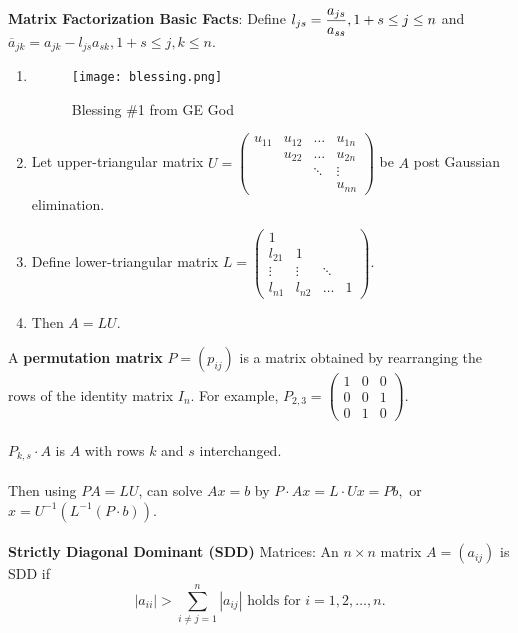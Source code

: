 \documentclass{article}
\begin{document}
\textbf{Matrix Factorization Basic Facts}: Define $l_{js} = \mathlarger{\frac{a_{js}}{a_{ss}}}, 1 + s \leq j \leq n$ and $\overline{a}_{jk} = a_{jk} - l_{js} a_{sk}, 1 + s \leq j, k \leq n.$ \begin{enumerate}
    \item \begin{figure*}[htp]
    \centering
    \texttt{[image: blessing.png]}
    \caption{Blessing \#1 from GE God}
\end{figure*}
    \item Let upper-triangular matrix $U = \begin{pmatrix}
        u_{11} & u_{12} & \dots &u_{1n} \\
        & u_{22} & \dots &u_{2n} \\
        & & \ddots & \vdots \\
        & & & u_{nn}
    \end{pmatrix}$ be $A$ post Gaussian elimination.
    \item Define lower-triangular matrix $L = \begin{pmatrix}
        1 \\
        l_{21} & 1 \\
        \vdots & \vdots & \ddots \\
        l_{n1} & l_{n2} & \dots & 1
    \end{pmatrix}.$
    \item Then $A = LU$.
\end{enumerate} $ $ \\
A \textbf{permutation matrix} $P = (p_{ij})$ is a matrix obtained by rearranging the rows of the identity matrix $I_n$. For example, $P_{2, 3} = \begin{pmatrix}
    1 & 0 & 0 \\
    0 & 0 & 1 \\
    0 & 1 & 0
\end{pmatrix}$. \\ \\
$P_{k, s} \cdot A$ is $A$ with rows $k$ and $s$ interchanged. \\ \\
Then using $PA = LU$, can solve $Ax = b$ by $P \cdot Ax = L \cdot Ux = Pb,$ or $x = U^{-1}(L^{-1} (P \cdot b))$. \\ \\
\textbf{Strictly Diagonal Dominant (SDD)} Matrices: An $n \times n$ matrix $A = (a_{ij})$ is SDD if $$|a_{ii}| > \sum_{i \neq j = 1}^n |a_{ij}| \text{ holds for } i = 1, 2, \dots, n.$$ \\ \\
\end{document}
